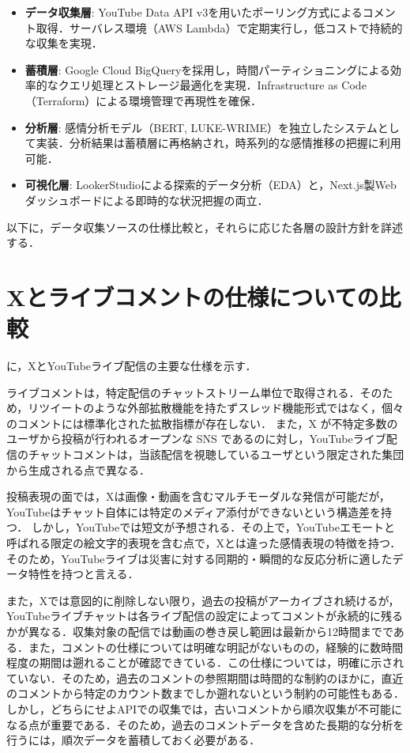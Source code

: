   \begin{itemize}
      \item \textbf{データ収集層}: YouTube Data API v3を用いたポーリング方式によるコメント取得．サーバレス環境（AWS Lambda）で定期実行し，低コストで持続的な収集を実現．
      \item \textbf{蓄積層}: Google Cloud BigQueryを採用し，時間パーティショニングによる効率的なクエリ処理とストレージ最適化を実現．Infrastructure as Code（Terraform）による環境管理で再現性を確保．
      \item \textbf{分析層}: 感情分析モデル（BERT, LUKE-WRIME）を独立したシステムとして実装．分析結果は蓄積層に再格納され，時系列的な感情推移の把握に利用可能．
      \item \textbf{可視化層}: LookerStudioによる探索的データ分析（EDA）と，Next.js製Webダッシュボードによる即時的な状況把握の両立．
  \end{itemize}


  以下に，データ収集ソースの仕様比較と，それらに応じた各層の設計方針を詳述する．

  \section{Xとライブコメントの仕様についての比較}
  \label{sec:comparison_yt_x}

  に，XとYouTubeライブ配信の主要な仕様を示す．
  
  
  
  ライブコメントは，特定配信のチャットストリーム単位で取得される．そのため，リツイートのような外部拡散機能を持たずスレッド機能形式ではなく，個々のコメントには標準化された拡散指標が存在しない．
  また，X が不特定多数のユーザから投稿が行われるオープンな SNS であるのに対し，YouTubeライブ配信のチャットコメントは，当該配信を視聴しているユーザという限定された集団から生成される点で異なる．
  
  投稿表現の面では，Xは画像・動画を含むマルチモーダルな発信が可能だが，YouTubeはチャット自体には特定のメディア添付ができないという構造差を持つ．
  しかし，YouTubeでは短文が予想される．その上で，YouTubeエモートと呼ばれる限定の絵文字的表現を含む点で，Xとは違った感情表現の特徴を持つ．
  そのため，YouTubeライブは災害に対する同期的・瞬間的な反応分析に適したデータ特性を持つと言える．
  
  また，Xでは意図的に削除しない限り，過去の投稿がアーカイブされ続けるが，YouTubeライブチャットは各ライブ配信の設定によってコメントが永続的に残るかが異なる．収集対象の配信では動画の巻き戻し範囲は最新から12時間までである．また，コメントの仕様については明確な明記がないものの，経験的に数時間程度の期間は遡れることが確認できている．この仕様については，明確に示されていない．そのため，過去のコメントの参照期間は時間的な制約のほかに，直近のコメントから特定のカウント数までしか遡れないという制約の可能性もある．しかし，どちらにせよAPIでの収集では，古いコメントから順次収集が不可能になる点が重要である．そのため，過去のコメントデータを含めた長期的な分析を行うには，順次データを蓄積しておく必要がある．

